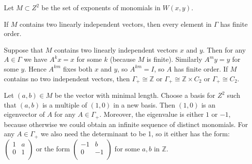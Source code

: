 \documentclass[a4paper]{article}
\begin{document}
	Let $M \subset Z^2$ be the set of exponents of monomials in $W(x,y)$.
	
\clm If $M$ contains two linearly independent vectors, then every element in $\Gamma$ has finite order.

 Suppose that $M$ contains two linearly independent vectors $x$ and $y$. Then for any $A \in \Gamma$ we have $A^k x= x$ for some $k$ (because $M$ is finite). Similarly $A^m y = y$ for some $y$. Hence $A^{k m}$ fixes both $x$ and $y$, so $A^{k m} = I$, so $A$ has finite order.
\clm If $M$ contains no two independent vectors, then $\Gamma_+ \cong \mathbb{Z}$ or $\Gamma_+ \cong \mathbb{Z} \times C_{2}$ or $\Gamma_+ \cong C_{2}$.

Let $(a,b) \in M$ be the vector with minimal length.
Choose a basis for $Z^2$ such that $(a,b)$ is a multiple of $(1,0)$ in a new basis. Then $(1,0)$ is an eigenvector of $A$ for any $A \in \Gamma_+$. Moreover, the eigenvalue is either $1$ or $-1$, because otherwise we could obtain an infinite sequence of distinct monomials. For any $A \in \Gamma_+$ we also need the determinant to be 1, so it either has the form:
$\begin{pmatrix}
	1 & a \\
	0 & 1 \\
\end{pmatrix}$ or the form 
$\begin{pmatrix}
-1 & b \\
0 & -1 \\
\end{pmatrix}$
for some $a, b$ in $\mathbb{Z}$.
\end{document}
